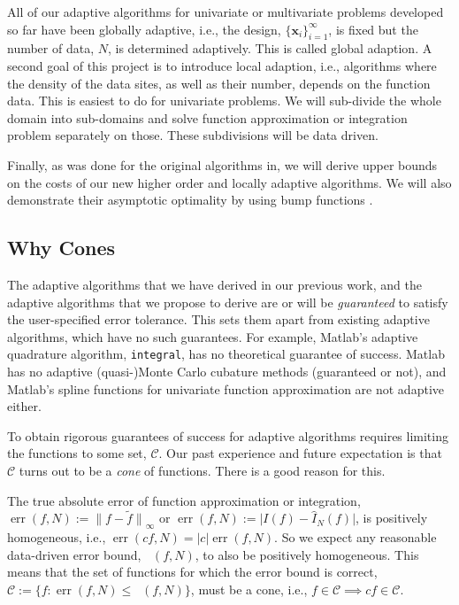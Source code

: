 \documentclass[11pt]{NSFamsart}
\newcommand{\hI}{\hat{I}}
\newcommand{\tf}{\tilde{f}}
\DeclareMathOperator{\err}{err}
\DeclareMathOperator{\oerr}{\overline{\err}}
\newcommand{\bx}{{\boldsymbol{x}}}
\newcommand{\calc}{{\mathcal{C}}}
\def\abs#1{\ensuremath{\left \lvert #1 \right \rvert}}
\newcommand{\bigabs}[1]{\ensuremath{\bigl \lvert #1 \bigr \rvert}}
\newcommand{\bignorm}[2][{}]{\ensuremath{\bigl \lVert #2 \bigr \rVert}_{#1}}
\newcommand{\desinf}{\{\bx_i\}_{i=1}^{\infty}}
\newcommand{\Matlab}{{\sc Matlab}\xspace}
\begin{document}
All of our adaptive algorithms for univariate or multivariate problems developed so far have been globally adaptive, i.e., the design, $\desinf$, is fixed but the number of data, $N$, is determined adaptively.  This is called global adaption.  A second goal of this project  is to introduce local adaption, i.e., algorithms where the density of the data sites, as well as their number, depends on the function data.  This is easiest to do for univariate problems.  We will sub-divide the whole domain into sub-domains and solve function approximation or integration problem separately on those.  These subdivisions will be data driven.

Finally, as was done for the original algorithms in\citep{HicEtal14b}, we will derive upper bounds on the costs of our new higher order and locally adaptive algorithms.  We will also demonstrate their asymptotic optimality by using bump functions \cite{TraWasWoz88,Nov88}.

\subsection*{Why Cones} The adaptive algorithms that we have derived in our previous work, and the adaptive algorithms that we propose to derive are or will be \emph{guaranteed} to satisfy the user-specified error tolerance.  This sets them apart from existing adaptive algorithms, which have no such guarantees.  For example, \Matlab's adaptive quadrature algorithm, \texttt{integral}, has no theoretical guarantee of success.  \Matlab has no adaptive (quasi-)Monte Carlo cubature methods (guaranteed or not), and \Matlab's spline functions for univariate function approximation are not adaptive either.

To obtain rigorous guarantees of success for adaptive algorithms requires limiting the functions to some set, $\calc$.  Our past experience and future expectation is that $\calc$ turns out to be a \emph{cone} of functions. There is a good reason for this.

The true absolute error of function approximation or integration, $\err(f,N):=\bignorm[\infty]{f-\tf}$ or $\err(f,N):= \bigabs{I(f) - \hI_N(f)}$, is positively homogeneous, i.e., $\err(cf,N)=\abs{c} \err(f,N)$. So we expect any reasonable data-driven error bound, $\oerr(f,N)$, to also be positively homogeneous.  This means that the set of functions for which the error bound is correct, $\calc:=\{f : \err(f,N) \le \oerr(f,N)\}$, must be a cone, i.e., $f\in \calc \implies cf \in \calc$.
\end{document}
